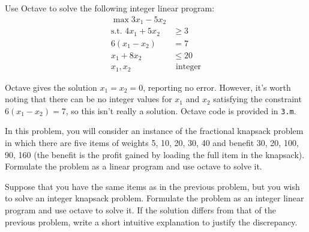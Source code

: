 \documentclass[fleqn]{homework}
\begin{document}
  \begin{problem}{3}
    \begin{question}
      Use Octave to solve the following integer linear program:
      \begin{align*}
        \max 3x_1 - 5x_2 & \\
        \text{s.t.  } 4x_1 + 5x_2 &\ge 3 \\
        6(x_1 - x_2) &= 7 \\
        x_1 + 8x_2 &\le 20 \\
        x_1, x_2 &\text{ integer}
      \end{align*}
    \end{question}

    Octave gives the solution $x_1 = x_2 = 0$, reporting no error.  However,
    it's worth noting that there can be no integer values for $x_1$ and $x_2$
    satisfying the constraint $6(x_1 - x_2) = 7$, so this isn't really a
    solution.  Octave code is provided in \texttt{3.m}.
  \end{problem}

  \begin{problem}{4}
    \begin{question}
      In this problem, you will consider an instance of the fractional knapsack
      problem in which there are five items of weights 5, 10, 20, 30, 40 and
      benefit 30, 20, 100, 90, 160 (the benefit is the profit gained by loading
      the full item in the knapsack).  Formulate the problem as a linear program
      and use octave to solve it.
    \end{question}
  \end{problem}

  \begin{problem}{5}
    \begin{question}
      Suppose that you have the same items as in the previous problem, but you
      wish to solve an integer knapsack problem.  Formulate the problem as an
      integer linear program and use octave to solve it.  If the solution
      differs from that of the previous problem, write a short intuitive
      explanation to justify the discrepancy.
    \end{question}
  \end{problem}
\end{document}
